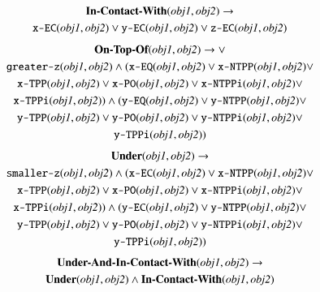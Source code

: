 \documentclass[preprint,12pt]{elsarticle}
\begin{document}
\begin{gather}
\label{eq:in-contact-with}
\textbf{In-Contact-With}(\textit{obj1}, \textit{obj2}) \rightarrow \\
\texttt{x-EC}(\textit{obj1}, \textit{obj2}) \vee \texttt{y-EC}(\textit{obj1}, \textit{obj2}) \vee \texttt{z-EC}(\textit{obj1}, \textit{obj2})\notag
\end{gather}
\begin{gather}
\label{eq:on-top-of}
\textbf{On-Top-Of}(\textit{obj1}, \textit{obj2}) \rightarrow \vee \\
\texttt{greater-z}(\textit{obj1}, \textit{obj2}) \wedge (\texttt{x-EQ}(\textit{obj1}, \textit{obj2}) \vee \texttt{x-NTPP}(\textit{obj1}, \textit{obj2}) \vee \notag\\
\texttt{x-TPP}(\textit{obj1}, \textit{obj2}) \vee \texttt{x-PO}(\textit{obj1}, \textit{obj2}) \vee \texttt{x-NTPPi}(\textit{obj1}, \textit{obj2}) \vee \notag\\
\texttt{x-TPPi}(\textit{obj1}, \textit{obj2})) \wedge (\texttt{y-EQ}(\textit{obj1}, \textit{obj2}) \vee \texttt{y-NTPP}(\textit{obj1}, \textit{obj2}) \vee \notag\\
\texttt{y-TPP}(\textit{obj1}, \textit{obj2}) \vee \texttt{y-PO}(\textit{obj1}, \textit{obj2}) \vee \texttt{y-NTPPi}(\textit{obj1}, \textit{obj2}) \vee \notag\\
\texttt{y-TPPi}(\textit{obj1}, \textit{obj2})) \notag
\end{gather}
\begin{gather}
\label{eq:under}
\textbf{Under}(\textit{obj1}, \textit{obj2}) \rightarrow \\
\texttt{smaller-z}(\textit{obj1}, \textit{obj2}) \wedge (\texttt{x-EC}(\textit{obj1}, \textit{obj2}) \vee \texttt{x-NTPP}(\textit{obj1}, \textit{obj2}) \vee  \notag\\
\texttt{x-TPP}(\textit{obj1}, \textit{obj2}) \vee \texttt{x-PO}(\textit{obj1}, \textit{obj2}) \vee \texttt{x-NTPPi}(\textit{obj1}, \textit{obj2}) \vee  \notag\\
\texttt{x-TPPi}(\textit{obj1}, \textit{obj2})) \wedge (\texttt{y-EC}(\textit{obj1}, \textit{obj2}) \vee \texttt{y-NTPP}(\textit{obj1}, \textit{obj2}) \vee  \notag\\
\texttt{y-TPP}(\textit{obj1}, \textit{obj2}) \vee \texttt{y-PO}(\textit{obj1}, \textit{obj2}) \vee \texttt{y-NTPPi}(\textit{obj1}, \textit{obj2}) \vee  \notag\\
\texttt{y-TPPi}(\textit{obj1}, \textit{obj2})) \notag
\end{gather}
\begin{gather}
\label{eq:Under-And-In-Contact-With}
\textbf{Under-And-In-Contact-With}(\textit{obj1}, \textit{obj2}) \rightarrow \\
\textbf{Under}(\textit{obj1}, \textit{obj2}) \wedge \textbf{In-Contact-With}(\textit{obj1}, \textit{obj2})\notag
\end{gather}
\end{document}
